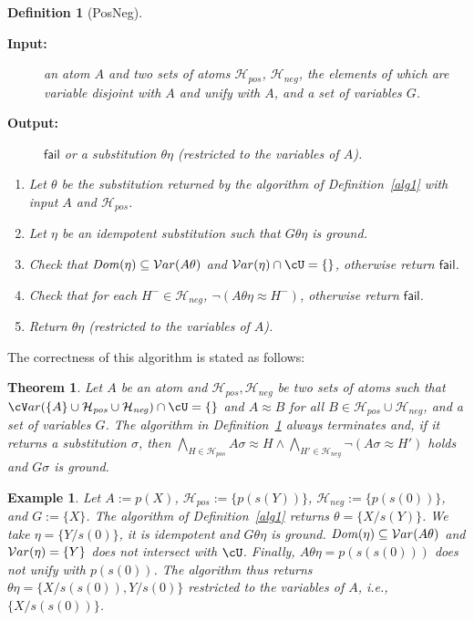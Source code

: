 \documentclass[fleqn]{tlp}
\newtheorem{definition}{Definition} \newtheorem{example}{Example} \newtheorem{lemma}{Lemma} \newtheorem{proposition}{Proposition} \newtheorem{theorem}{Theorem} \newtheorem{corollary}{Corollary}
\newcommand{\fail}{\mathsf{fail}}
\newcommand{\var}{{\cV}ar}
\newcommand{\Dom}{\mathit{Dom}}
\newcommand{\Hpos}{\mathcal{H}_{\mathit{pos}}}
\newcommand{\Hneg}{\mathcal{H}_{\mathit{neg}}}
\begin{document}
\begin{definition}[PosNeg] \label{alg2}
\begin{description}
\item[\textbf{Input:}] an atom $A$ and two sets of atoms
  $\Hpos$, $\Hneg$, the elements of which are variable
  disjoint with $A$ and unify with $A$, and
  a set of variables $G$. 
\item[\textbf{Output:}] $\fail$ or a substitution $\theta\eta$
  (restricted to the variables of $A$).
\end{description}

\begin{enumerate}\itemsep2pt
\item Let $\theta$ be the substitution returned by the algorithm
  of Definition~\ref{alg1}
  with input $A$ and $\Hpos$.
\item Let $\eta$  be an idempotent substitution such that
  $G\theta\eta$ is ground.
\item Check that 
  $\Dom(\eta)\subseteq\Var(A\theta)$ and
  $\Var(\eta)\cap \cU=\emptyset$,
  otherwise return $\fail$.
\item Check that for each $H^-\in\Hneg$, 
  $\neg (A\theta\eta\approx H^-)$,
  otherwise return $\fail$.
\item Return $\theta\eta$
  (restricted to the variables of $A$). 
\end{enumerate}
\end{definition}
The correctness of this algorithm is stated as follows:

\begin{theorem}\label{theorem:correction-algo-posneg}
  Let $A$ be an atom and $\Hpos,\Hneg$ be two sets of atoms such that
  $\var(\{A\}\cup\Hpos\cup\Hneg)\cap\cU=\emptyset$ and $A\approx B$
  for all $B\in\Hpos\cup\Hneg$, 
  and a set of variables $G$.
  The algorithm in Definition~\ref{alg2} always terminates and, if it
  returns a substitution $\sigma$, then $\bigwedge_{H\in\Hpos}
  A\sigma\approx H\wedge \bigwedge_{H'\in\Hneg} \neg(A\sigma\approx
  H')$ holds and $G\sigma$ is ground.
\end{theorem}

\begin{example}
  Let $A:=p(X)$, $\Hpos:=\{p(s(Y))\}$, $\Hneg:=\{p(s(0))\}$,  
  and $G:=\{X\}$.
  The algorithm of Definition~\ref{alg1} 
  returns $\theta = \{X/s(Y)\}$. 
  We take $\eta=\{Y/s(0)\}$, it is idempotent and  
  $G\theta\eta$ is ground.
  $\Dom(\eta)\subseteq \Var(A\theta)$ 
  and ${\cal V}ar(\eta)=\{Y\}$ does not intersect with $\cU$.
  Finally, $A\theta\eta=p(s(s(0)))$ does not unify with $p(s(0))$.
  The algorithm thus returns $\theta\eta=\{X/s(s(0)),Y/s(0)\}$
  restricted to the variables of $A$, i.e., 
  $\{X/s(s(0))\}$.
\end{example}
\end{document}
